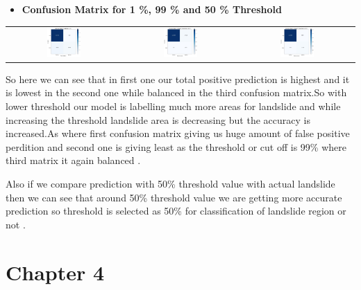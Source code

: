 \documentclass[12pt,a4paper]{report}
\begin{document}
\begin{itemize}
		\item \textbf{Confusion Matrix for 1 \%, 99 \%  and 50 \% Threshold}
\end{itemize}  
		    \begin{tabular}{c c c}
 \includegraphics[width=0.31\textwidth]{th1}&
 \includegraphics[width=0.31\textwidth]{th99}&
 \includegraphics[width=0.31\textwidth]{th50}
    \end{tabular}
So here we can see that in first one our total positive prediction is highest and it is lowest in the second one while balanced in the third confusion matrix.So with lower threshold our model is labelling much more areas for landslide and while increasing the threshold landslide area is decreasing but the accuracy is increased.As where first confusion matrix giving us huge amount of false positive perdition and second one is giving least as the threshold or cut off is 99\% where third matrix it again balanced .

Also if we compare prediction with 50\% threshold value with actual landslide then we can see that around 50\% threshold value we are getting more accurate prediction so threshold is selected as 50\%  for classification of landslide region or not .



				{\vfill \chapter*{\centering \vfill Chapter 4 \vfill}\vfill}
				\thispagestyle{empty}
	\newpage
	\label{Performance Analysis}
\end{document}
